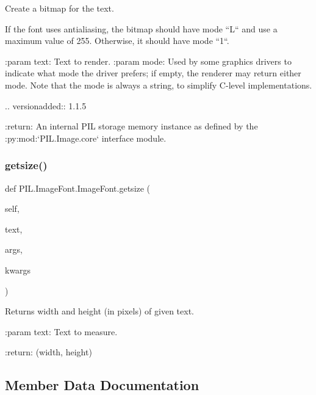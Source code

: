 \begin{DoxyVerb}Create a bitmap for the text.

If the font uses antialiasing, the bitmap should have mode ``L`` and use a
maximum value of 255. Otherwise, it should have mode ``1``.

:param text: Text to render.
:param mode: Used by some graphics drivers to indicate what mode the
     driver prefers; if empty, the renderer may return either
     mode. Note that the mode is always a string, to simplify
     C-level implementations.

     .. versionadded:: 1.1.5

:return: An internal PIL storage memory instance as defined by the
 :py:mod:`PIL.Image.core` interface module.
\end{DoxyVerb}
 \mbox{\label{classPIL_1_1ImageFont_1_1ImageFont_addde416540e28d46d1de2d9c5ca65f51}} 
\subsubsection{\texorpdfstring{getsize()}{getsize()}}
{\footnotesize\ttfamily def P\+I\+L.\+Image\+Font.\+Image\+Font.\+getsize (\begin{DoxyParamCaption}\item[{}]{self,  }\item[{}]{text,  }\item[{}]{args,  }\item[{}]{kwargs }\end{DoxyParamCaption})}

\begin{DoxyVerb}Returns width and height (in pixels) of given text.

:param text: Text to measure.

:return: (width, height)
\end{DoxyVerb}
 

\subsection{Member Data Documentation}
\mbox{\label{classPIL_1_1ImageFont_1_1ImageFont_a98d1d26b27442a20e03d4365f5bf6e66}} 
